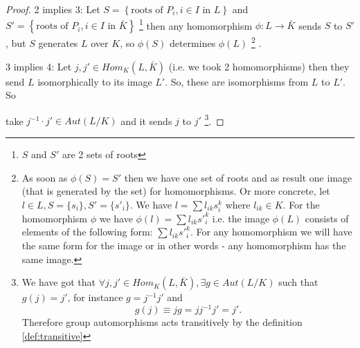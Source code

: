 \begin{theorem}
\begin{proof}
    2 implies 3: Let
    $S = \left\{\mbox{roots of } P_i, i \in I \mbox{ in } L\right\}$
    and
    $S' = \left\{\mbox{roots of } P_i, i \in I \mbox{ in }
    \bar{K}\right\}$
    \footnote{
      $S$ and $S'$ are 2 sets of roots
    }
    then any homomorphism
    $\phi: L \to \bar{K}$ sends $S$ to $S'$, but $S$ generates $L$
    over $K$, so $\phi\left(S\right)$ determines $\phi\left(L\right)$
    \footnote{
      As soon as $\phi(S) = S'$ then we have one set of roots and as
      result one image (that is generated by the set) for
      homomorphisms. Or more concrete, let $l \in L, S = \{s_i\}, S' =
      \{s'_i\}$. We have $l = \sum l_{ik}s_i^k$ where $l_{ik} \in K$.
      For the homomorphism $\phi$ we have
      $\phi(l) = \sum l_{ik}{s'}_i^k$ i.e. the image $\phi(L)$ consists
      of elements of the following form: $\sum l_{ik}{s'}_i^k$. For any
      homomorphism we will have the same form for the image or in
      other words - any homomorphism has the same image.
    }
    .

    3 implies 4: Let $j, j' \in Hom_K\left(L, \bar{K}\right)$
    (i.e. we took 2 homomorphisms)
    then
    they send $L$ isomorphically to its image $L'$. So, these are
    isomorphisms from $L$ to $L'$. So

    
    take $j^{-1} \cdot j' \in Aut \left(L/K\right)$ and it sends $j$
    to $j'$
    \footnote{
      We have got that $\forall j, j' \in Hom_K\left(L,
      \bar{K}\right), \exists g \in Aut\left(L/K\right)$
      such that $g(j) = j'$, for instance $g = j^{-1}j'$ and
      \begin{equation}
        g(j) \equiv j g = j j^{-1} j' = j'.
        \label{eq:lec5_groupaction}
      \end{equation}
        Therefore group
      automorphisms acts transitively by the definition
      \ref{def:transitive}
    }.


\end{proof}
\end{theorem}
